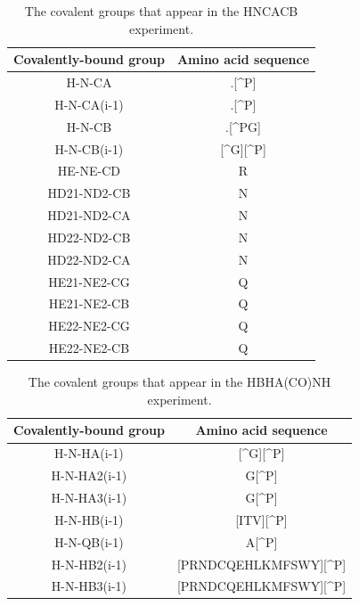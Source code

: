 \begin{table}
  \begin{tabular}{ | c | c | }
    \hline
    Covalently-bound group  &  Amino acid sequence  \\  \hline
    H-N-CA                       &  .[\^{}P]             \\  \hline
    H-N-CA(i-1)                  &  .[\^{}P]             \\  \hline
    H-N-CB                       &  .[\^{}PG]            \\  \hline
    H-N-CB(i-1)                  &  [\^{}G][\^{}P]       \\  \hline
    HE-NE-CD                     &  R                    \\  \hline
    HD21-ND2-CB                  &  N                    \\  \hline
    HD21-ND2-CA                  &  N                    \\  \hline
    HD22-ND2-CB                  &  N                    \\  \hline
    HD22-ND2-CA                  &  N                    \\  \hline
    HE21-NE2-CG                  &  Q                    \\  \hline
    HE21-NE2-CB                  &  Q                    \\  \hline
    HE22-NE2-CG                  &  Q                    \\  \hline
    HE22-NE2-CB                  &  Q                    \\  \hline
  \end{tabular}
  \caption{The covalent groups that appear in the HNCACB experiment.}
  \label{hncacb_peaktypes}
\end{table}

\begin{table}
  \begin{tabular}{ | c | c | }
    \hline
    Covalently-bound group  &  Amino acid sequence         \\  \hline
    H-N-HA(i-1)                  &  [\^{}G][\^{}P]              \\  \hline
    H-N-HA2(i-1)                 &  G[\^{}P]                    \\  \hline
    H-N-HA3(i-1)                 &  G[\^{}P]                    \\  \hline
    H-N-HB(i-1)                  &  [ITV][\^{}P]                \\  \hline
    H-N-QB(i-1)                  &  A[\^{}P]                    \\  \hline
    H-N-HB2(i-1)                 &  [PRNDCQEHLKMFSWY][\^{}P]    \\  \hline
    H-N-HB3(i-1)                 &  [PRNDCQEHLKMFSWY][\^{}P]    \\  \hline
  \end{tabular}
  \caption{The covalent groups that appear in the HBHA(CO)NH experiment.}
  \label{hbhaconh_peaktypes}
\end{table}

